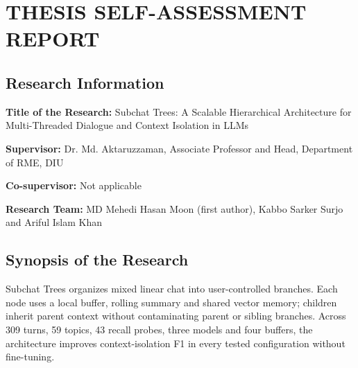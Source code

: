 \chapter{THESIS SELF-ASSESSMENT REPORT}
\label{annex:self_assessment}
\vspace{-3em}

\section{Research Information}

\textbf{Title of the Research:} Subchat Trees: A Scalable Hierarchical Architecture for Multi-Threaded Dialogue and Context Isolation in LLMs

\textbf{Supervisor:} Dr. Md. Aktaruzzaman, Associate Professor and Head, Department of RME, DIU

\textbf{Co-supervisor:} Not applicable

\textbf{Research Team:} MD Mehedi Hasan Moon (first author), Kabbo Sarker Surjo and Ariful Islam Khan

\section{Synopsis of the Research}
Subchat Trees organizes mixed linear chat into user-controlled branches. Each node uses a local buffer, rolling summary and shared vector memory; children inherit parent context without contaminating parent or sibling branches. Across 309 turns, 59 topics, 43 recall probes, three models and four buffers, the architecture improves context-isolation F1 in every tested configuration without fine-tuning.


